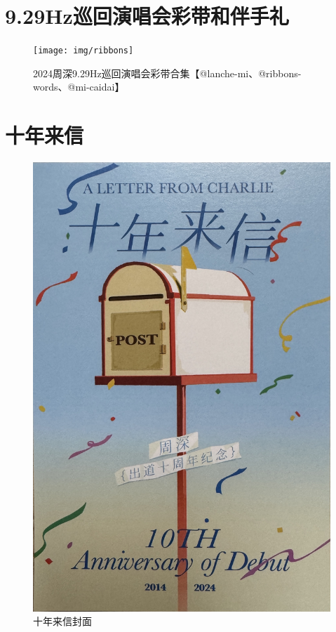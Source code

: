 \documentclass[]{ctexbook}
\begin{document}
\chapter{9.29Hz巡回演唱会彩带和伴手礼}\label{appendix-gift}

\begin{figure}

{\centering \texttt{[image: img/ribbons]} 

}

\caption{2024周深9.29Hz巡回演唱会彩带合集【@lanche-mi、@ribbons-words、@mi-caidai】}\label{fig:unnamed-chunk-155}
\end{figure}

\chapter{十年来信}\label{appendix-letter}

\begin{figure}

{\centering \includegraphics[width=340pt]{img/letter-cover} 

}

\caption{十年来信封面}\label{fig:unnamed-chunk-157}
\end{figure}
\end{document}
